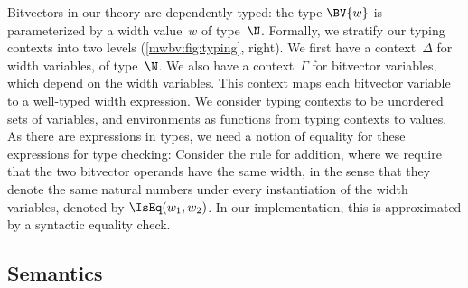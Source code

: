 Bitvectors in our theory are dependently typed: the type $\BV{w}$ is
parameterized by a width value~$w$ of type~$\N$.
%
Formally, we stratify our typing contexts into two levels (\cref{mwbv:fig:typing},
right).
%
We first have a context~$\Delta$ for width variables, of type~$\N$.
%
We also have a context~$\Gamma$ for bitvector variables, which depend on the
width variables. This context maps each bitvector variable to a well-typed width
expression. We consider typing contexts to be unordered sets of variables, and
environments as functions from typing contexts to values.
As there are expressions in types, we need a notion of equality for these
expressions for type checking:
Consider the rule for addition, where we require that the two bitvector operands
have the same width, in the sense that they denote the same natural numbers
under every instantiation of the width variables, denoted by $\IsEq(w_1, w_2)$.
%
In our implementation, this is approximated by a syntactic equality check.

\subsection{Semantics}
\label{mwbv:sec:semantics}


